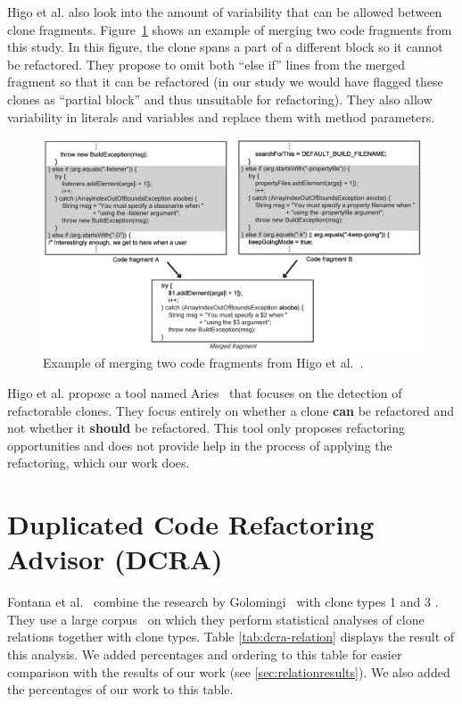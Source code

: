 Higo et al. also look into the amount of variability that can be allowed between clone fragments. Figure~\ref{fig:higomerge} shows an example of merging two code fragments from this study. In this figure, the clone spans a part of a different block so it cannot be refactored. They propose to omit both ``else if'' lines from the merged fragment so that it can be refactored (in our study we would have flagged these clones as ``partial block'' and thus unsuitable for refactoring). They also allow variability in literals and variables and replace them with method parameters.

\begin{figure}[H]
  \includegraphics[width=1\textwidth]{img/higo}
  \caption{Example of merging two code fragments from Higo et al.~\cite{higo2008metric}.}
  \label{fig:higomerge}
\end{figure}

Higo et al. propose a tool named Aries~\cite{higo2004aries, higo2008metric} that focuses on the detection of refactorable clones. They focus entirely on whether a clone \textbf{can} be refactored and not whether it \textbf{should} be refactored. This tool only proposes refactoring opportunities and does not provide help in the process of applying the refactoring, which our work does.

\section{Duplicated Code Refactoring Advisor (DCRA)}
Fontana et al.~\cite{fontana2012duplicated, fontana2015duplicated} combine the research by Golomingi~\cite{koni2001scenario} with clone types 1 and 3 \cite{roy2007survey}. They use a large corpus~\cite{tempero2010qualitas} on which they perform statistical analyses of clone relations together with clone types. Table \ref{tab:dcra-relation} displays the result of this analysis. We added percentages and ordering to this table for easier comparison with the results of our work (see \ref{sec:relationresults}). We also added the percentages of our work to this table.

